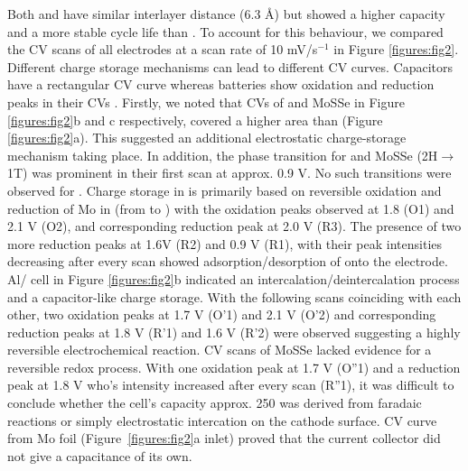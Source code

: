 Both  and  have similar interlayer distance (6.3 \AA) but  showed a higher capacity and a more stable cycle life than . To account for this behaviour, we compared the CV scans of all electrodes at a scan rate of 10 mV/s$^{-1}$ in Figure \ref{figures:fig2}. Different charge storage mechanisms can lead to different CV curves. Capacitors have a rectangular CV curve whereas batteries show oxidation and reduction peaks in their CVs \cite{jiao_aluminum-ion_2016}. Firstly, we noted that CVs of  and MoSSe in Figure \ref{figures:fig2}b and c respectively, covered a higher area than  (Figure \ref{figures:fig2}a). This suggested an additional electrostatic charge-storage mechanism taking place. In addition, the phase transition for  and MoSSe (2H$\rightarrow$1T) was prominent in their first scan at approx. 0.9 V. No such transitions were observed for . Charge storage in  is primarily based on reversible oxidation and reduction of Mo in  (from  to ) with the oxidation peaks observed at 1.8 (O1) and 2.1 V (O2), and corresponding reduction peak at 2.0 V (R3). The presence of two more reduction peaks at 1.6V (R2) and 0.9 V (R1), with their peak intensities decreasing after every scan showed adsorption/desorption of  onto the electrode. Al/ cell in Figure \ref{figures:fig2}b indicated an intercalation/deintercalation process and a capacitor-like charge storage. With the following scans coinciding with each other, two oxidation peaks at 1.7 V (O'1) and 2.1 V (O'2) and corresponding reduction peaks at 1.8 V (R'1) and 1.6 V (R'2) were observed suggesting a highly reversible electrochemical reaction. CV scans of MoSSe lacked evidence for a reversible redox process. With one oxidation peak at 1.7 V (O''1) and a reduction peak at 1.8 V who's intensity increased after every scan (R''1), it was difficult to conclude whether the cell's capacity approx. 250 was derived from faradaic reactions or simply electrostatic intercation on the cathode surface. CV curve from Mo foil (Figure\ \ref{figures:fig2}a inlet) proved that the current collector did not give a capacitance of its own.

